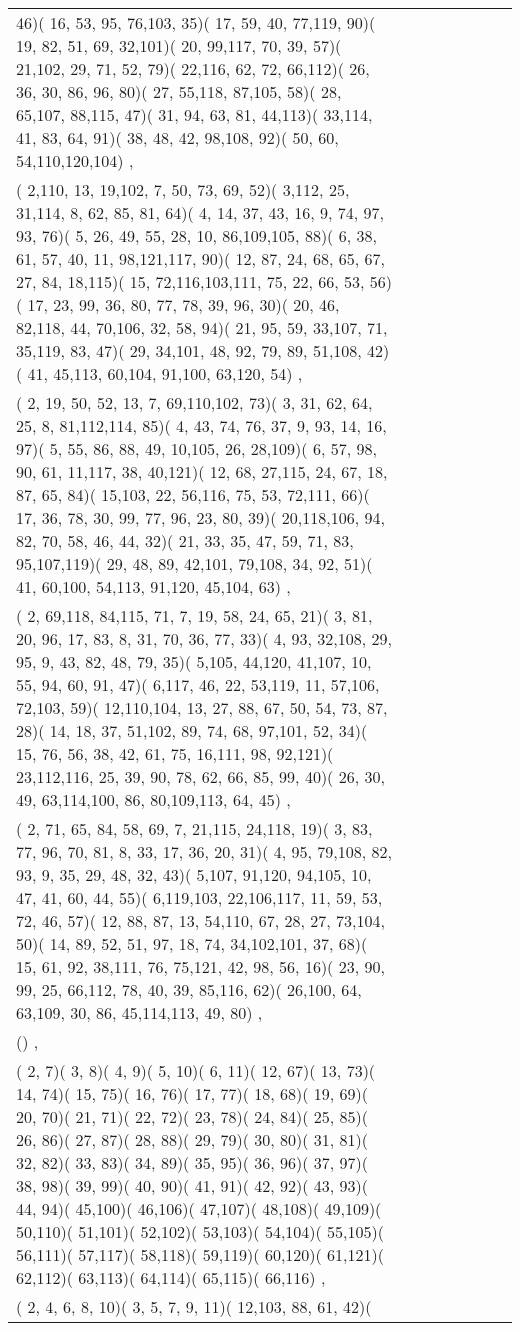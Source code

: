 \documentclass[border=10]{standalone}
\begin{document}
\begin{tabular}{@{}l@{}l@{}l@{}l@{}l@{}l@{}l@{}l@{}}
46)( 16, 53, 95, 76,103, 35)( 17, 59, 40, 77,119, 90)( 19, 82, 51, 69, 32,101)( 20, 99,117, 70, 39, 57)( 21,102, 29, 71, 52, 79)( 22,116, 62, 72, 66,112)( 26, 36, 30, 86, 96, 80)( 27, 55,118, 87,105, 58)( 28, 65,107, 88,115, 47)( 31, 94, 63, 81, 44,113)( 33,114, 41, 83, 64, 91)( 38, 48, 42, 98,108, 92)( 50, 60, 54,110,120,104) ,\\  (  2,110, 13, 19,102,  7, 50, 73, 69, 52)(  3,112, 25, 31,114,  8, 62, 85, 81, 64)(  4, 14, 37, 43, 16,  9, 74, 97, 93, 76)(  5, 26, 49, 55, 28, 10, 86,109,105, 88)(  6, 38, 61, 57, 40, 11, 98,121,117, 90)( 12, 87, 24, 68, 65, 67, 27, 84, 18,115)( 15, 72,116,103,111, 75, 22, 66, 53, 56)( 17, 23, 99, 36, 80, 77, 78, 39, 96, 30)( 20, 46, 82,118, 44, 70,106, 32, 58, 94)( 21, 95, 59, 33,107, 71, 35,119, 83, 47)( 29, 34,101, 48, 92, 79, 89, 51,108, 42)( 41, 45,113, 60,104, 91,100, 63,120, 54) ,\\  (  2, 19, 50, 52, 13,  7, 69,110,102, 73)(  3, 31, 62, 64, 25,  8, 81,112,114, 85)(  4, 43, 74, 76, 37,  9, 93, 14, 16, 97)(  5, 55, 86, 88, 49, 10,105, 26, 28,109)(  6, 57, 98, 90, 61, 11,117, 38, 40,121)( 12, 68, 27,115, 24, 67, 18, 87, 65, 84)( 15,103, 22, 56,116, 75, 53, 72,111, 66)( 17, 36, 78, 30, 99, 77, 96, 23, 80, 39)( 20,118,106, 94, 82, 70, 58, 46, 44, 32)( 21, 33, 35, 47, 59, 71, 83, 95,107,119)( 29, 48, 89, 42,101, 79,108, 34, 92, 51)( 41, 60,100, 54,113, 91,120, 45,104, 63) ,\\  (  2, 69,118, 84,115, 71,  7, 19, 58, 24, 65, 21)(  3, 81, 20, 96, 17, 83,  8, 31, 70, 36, 77, 33)(  4, 93, 32,108, 29, 95,  9, 43, 82, 48, 79, 35)(  5,105, 44,120, 41,107, 10, 55, 94, 60, 91, 47)(  6,117, 46, 22, 53,119, 11, 57,106, 72,103, 59)( 12,110,104, 13, 27, 88, 67, 50, 54, 73, 87, 28)( 14, 18, 37, 51,102, 89, 74, 68, 97,101, 52, 34)( 15, 76, 56, 38, 42, 61, 75, 16,111, 98, 92,121)( 23,112,116, 25, 39, 90, 78, 62, 66, 85, 99, 40)( 26, 30, 49, 63,114,100, 86, 80,109,113, 64, 45) ,\\  (  2, 71, 65, 84, 58, 69,  7, 21,115, 24,118, 19)(  3, 83, 77, 96, 70, 81,  8, 33, 17, 36, 20, 31)(  4, 95, 79,108, 82, 93,  9, 35, 29, 48, 32, 43)(  5,107, 91,120, 94,105, 10, 47, 41, 60, 44, 55)(  6,119,103, 22,106,117, 11, 59, 53, 72, 46, 57)( 12, 88, 87, 13, 54,110, 67, 28, 27, 73,104, 50)( 14, 89, 52, 51, 97, 18, 74, 34,102,101, 37, 68)( 15, 61, 92, 38,111, 76, 75,121, 42, 98, 56, 16)( 23, 90, 99, 25, 66,112, 78, 40, 39, 85,116, 62)( 26,100, 64, 63,109, 30, 86, 45,114,113, 49, 80) ,\\  () ,\\  (  2,  7)(  3,  8)(  4,  9)(  5, 10)(  6, 11)( 12, 67)( 13, 73)( 14, 74)( 15, 75)( 16, 76)( 17, 77)( 18, 68)( 19, 69)( 20, 70)( 21, 71)( 22, 72)( 23, 78)( 24, 84)( 25, 85)( 26, 86)( 27, 87)( 28, 88)( 29, 79)( 30, 80)( 31, 81)( 32, 82)( 33, 83)( 34, 89)( 35, 95)( 36, 96)( 37, 97)( 38, 98)( 39, 99)( 40, 90)( 41, 91)( 42, 92)( 43, 93)( 44, 94)( 45,100)( 46,106)( 47,107)( 48,108)( 49,109)( 50,110)( 51,101)( 52,102)( 53,103)( 54,104)( 55,105)( 56,111)( 57,117)( 58,118)( 59,119)( 60,120)( 61,121)( 62,112)( 63,113)( 64,114)( 65,115)( 66,116) ,\\  (  2,  4,  6,  8, 10)(  3,  5,  7,  9, 11)( 12,103, 88, 61, 42)( 
\end{tabular}
\end{document}
